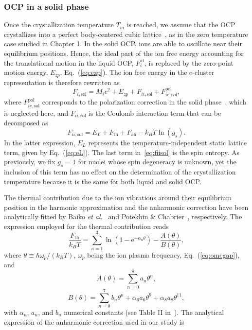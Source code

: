 \subsubsection{OCP in a solid phase}

Once the crystallization temperature $T_m$ is reached, we assume that the OCP 
crystallizes into a perfect body-centered cubic lattice~\cite{Chamel2016}, as
in the zero temperature case studied in Chapter 1. In the solid OCP, ions are
able to oscillate near their equilibrium positions. Hence, the ideal 
part of the ion free energy accounting for the translational motion in the 
liquid OCP, $F_{i}^{\text{id}}$, is replaced by the zero-point motion energy, 
$E_{zp}$, Eq.~(\ref{eq:ezp}). The ion free energy in the e-cluster
representation is therefore rewritten as
%
\begin{equation}
  F_{i,\text{sol}} = M_{i}c^2 + E_{zp} + F_{ii,\text{sol}} +
  F_{ie,\text{sol}}^{\text{pol}},
\end{equation}
%
where $F_{ie,\text{sol}}^{\text{pol}}$ corresponds to the polarization
correction in the solid phase~\cite{Potekhin2000}, which is neglected here, and
$F_{ii,\text{sol}}$ is the Coulomb interaction term that can be decomposed as
%
\begin{equation}
  F_{ii,\text{sol}} = E_L + F_{\text{th}} + F_{\text{ah}} - k_B
  T\ln(g_s).\label{eq:fiisol}
\end{equation}
%
In the latter expression, $E_L$ represents the temperature-independent static 
lattice term, given by Eq.~(\ref{eq:eL}). The last term in~\ref{eq:fiisol} is
the spin entropy. As previously, we fix $g_s=1$ for nuclei whose spin 
degeneracy is unknown, yet the inclusion of this term has no effect on the 
determination of the crystallization temperature because it is the same for 
both liquid and solid OCP.

The thermal contribution due to the ion vibrations around their equilibrium 
position in the harmonic approximation and the anharmonic correction have been 
analytically fitted by Baiko \textit{et al.}~\cite{Baiko2001} and Potekhin \&
Chabrier~\cite{Potekhin2010}, respectively. 
The expression employed for the thermal contribution reads~\cite{Baiko2001}
%
\begin{equation}
  \frac{F_{\text{th}}}{k_B T} = \sum_{n=1}^3\ln\left(1
    -\text{e}^{-\alpha_n\theta}\right) 
  - \frac{A(\theta)}{B(\theta)},
\end{equation}
%
where $\theta \equiv \hbar\omega_p/(k_B T)$, $\omega_p$ being the ion plasma
frequency, Eq.~(\ref{eq:omegap}), and
%
\begin{equation}
  A(\theta) = \sum_{n=0}^{8}a_n\theta^n,
\end{equation}
%
\begin{equation}
  B(\theta) = \sum_{n=0}^{7}b_n\theta^n 
  + \alpha_6 a_6 \theta^9 
  + \alpha_8 a_8 \theta^{11},
\end{equation}
%
with $\alpha_n$, $a_n$, and $b_n$ numerical constants (see Table II
in~\cite{Baiko2001}).
The analytical expression of the anharmonic correction used in our study
is~\cite{Potekhin2010}

